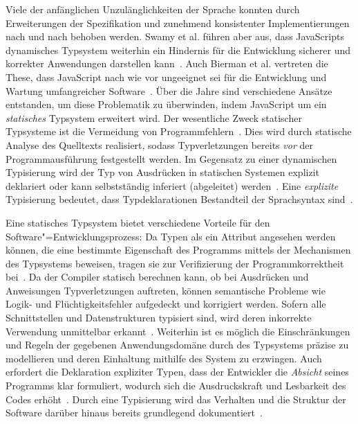 Viele der anfänglichen Unzulänglichkeiten der Sprache konnten durch Erweiterungen der Spezifikation und zunehmend konsistenter Implementierungen nach und nach behoben werden. Swamy et al. führen aber aus, dass JavaScripts dynamisches Typsystem weiterhin ein Hindernis für die Entwicklung sicherer und korrekter Anwendungen darstellen kann~\autocite{NIKHIL:2014}. Auch Bierman et al. vertreten die These, dass JavaScript nach wie vor ungeeignet sei für die Entwicklung und Wartung umfangreicher Software~\autocite[1]{BIERMAN:2014}. Über die Jahre sind verschiedene Ansätze entstanden, um diese Problematik zu überwinden, indem JavaScript um ein \emph{statisches} Typsystem erweitert wird. Der wesentliche Zweck statischer Typsysteme ist die Vermeidung von Programmfehlern~\autocite[1]{CARDELLI:TYPE_SYSTEMS}. Dies wird durch statische Analyse des Quelltexts realisiert, sodass Typverletzungen bereits \emph{vor} der Programmausführung festgestellt werden. Im Gegensatz zu einer dynamischen Typisierung wird der Typ von Ausdrücken in statischen Systemen explizit deklariert oder kann selbstständig inferiert (abgeleitet) werden~\autocite[45]{WALDMANN:PPS}. Eine \emph{explizite} Typisierung bedeutet, dass Typdeklarationen Bestandteil der Sprachsyntax sind~\autocite[2]{CARDELLI:TYPE_SYSTEMS}.

Eine statisches Typsystem bietet verschiedene Vorteile für den Software"=Entwicklungsprozess: Da Typen als ein Attribut angesehen werden können, die eine bestimmte Eigenschaft des Programms mittels der Mechanismen des Typsystems beweisen, tragen sie zur Verifizierung der Programmkorrektheit bei~\autocite{SMITH:TYPE_SYSTEMS}. Da der Compiler statisch berechnen kann, ob bei Ausdrücken und Anweisungen Typverletzungen auftreten, können semantische Probleme wie Logik- und Flüchtigkeitsfehler aufgedeckt und korrigiert werden. Sofern alle Schnittstellen und Datenstrukturen typisiert sind, wird deren inkorrekte Verwendung unmittelbar erkannt~\autocite[6]{CARDELLI:TYPE_SYSTEMS}. Weiterhin ist es möglich die Einschränkungen und Regeln der gegebenen Anwendungsdomäne durch des Typsystems präzise zu modellieren und deren Einhaltung mithilfe des System zu erzwingen. Auch erfordert die Deklaration expliziter Typen, dass der Entwickler die \emph{Absicht} seines Programms klar formuliert, wodurch sich die Ausdruckskraft und Lesbarkeit des Codes erhöht~\autocite[96]{WALDMANN:PPS}. Durch eine Typisierung wird das Verhalten und die Struktur der Software darüber hinaus bereits grundlegend dokumentiert~\autocite[Abschn. 6.1.1]{MITCHELL:CONCEPTS}.

